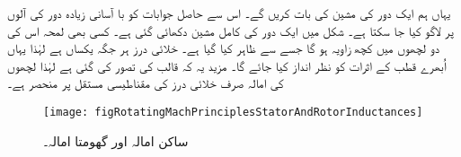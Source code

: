 یہاں ہم ایک دور کی مشین کی بات کریں گے۔ اس سے حاصل جوابات کو با آسانی زیادہ دور کی آلوں پر لاگو کیا جا سکتا ہے۔ شکل  میں ایک دور کی کامل مشین دکھائی گئی ہے۔ کسی بھی لمحہ اس کی دو لچھوں میں کچھ زاویہ ہو گا جسے  سے ظاہر کیا گیا ہے۔ خلائی درز ہر جگہ یکساں ہے لہٰذا یہاں اُبھرے قطب کے اثرات کو نظر انداز کیا جائے گا۔ مزید یہ کہ قالب  کی   تصور کی گئی ہے لہٰذا لچھوں کی امالہ صرف خلائی درز کی مقناطیسی مستقل  پر منحصر ہے۔
\begin{figure}
\centering
\texttt{[image: figRotatingMachPrinciplesStatorAndRotorInductances]}
\caption{ساکن امالہ اور گھومتا امالہ۔}
\label{شکل_گھومتے_مشین_ساکن_گھومتا_امالہ}
\end{figure}

